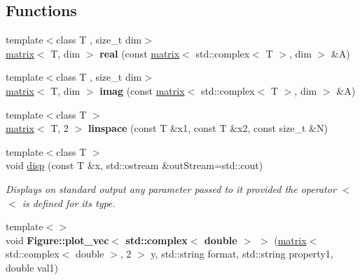 \subsection*{Functions}
\begin{DoxyCompactItemize}
\item 
\hypertarget{namespacekeycpp_a6ab8937a6378526f7514c6124fb9991a}{{\footnotesize template$<$class T , size\-\_\-t dim$>$ }\\\hyperlink{classkeycpp_1_1matrix}{matrix}$<$ T, dim $>$ {\bfseries real} (const \hyperlink{classkeycpp_1_1matrix}{matrix}$<$ std\-::complex$<$ T $>$, dim $>$ \&A)}\label{namespacekeycpp_a6ab8937a6378526f7514c6124fb9991a}

\item 
\hypertarget{namespacekeycpp_a026d42394a53ae81f292d1e3de4383cb}{{\footnotesize template$<$class T , size\-\_\-t dim$>$ }\\\hyperlink{classkeycpp_1_1matrix}{matrix}$<$ T, dim $>$ {\bfseries imag} (const \hyperlink{classkeycpp_1_1matrix}{matrix}$<$ std\-::complex$<$ T $>$, dim $>$ \&A)}\label{namespacekeycpp_a026d42394a53ae81f292d1e3de4383cb}

\item 
\hypertarget{namespacekeycpp_a4b8772b4517093ae5e6de3261ded005d}{{\footnotesize template$<$class T $>$ }\\\hyperlink{classkeycpp_1_1matrix}{matrix}$<$ T, 2 $>$ {\bfseries linspace} (const T \&x1, const T \&x2, const size\-\_\-t \&N)}\label{namespacekeycpp_a4b8772b4517093ae5e6de3261ded005d}

\item 
\hypertarget{namespacekeycpp_af4a2245da139cf6cf2e03426476b3b88}{{\footnotesize template$<$class T $>$ }\\void \hyperlink{namespacekeycpp_af4a2245da139cf6cf2e03426476b3b88}{disp} (const T \&x, std\-::ostream \&out\-Stream=std\-::cout)}\label{namespacekeycpp_af4a2245da139cf6cf2e03426476b3b88}

\begin{DoxyCompactList}\small\item\em Displays on standard output any parameter passed to it provided the operator $<$$<$ is defined for its type. \end{DoxyCompactList}\item 
\hypertarget{namespacekeycpp_a0a3e909a47a04eeb46b990d774592140}{{\footnotesize template$<$$>$ }\\void {\bfseries Figure\-::plot\-\_\-vec$<$ std\-::complex$<$ double $>$ $>$} (\hyperlink{classkeycpp_1_1matrix}{matrix}$<$ std\-::complex$<$ double $>$, 2 $>$ y, std\-::string format, std\-::string property1, double val1)}\label{namespacekeycpp_a0a3e909a47a04eeb46b990d774592140}


\end{DoxyCompactItemize}

